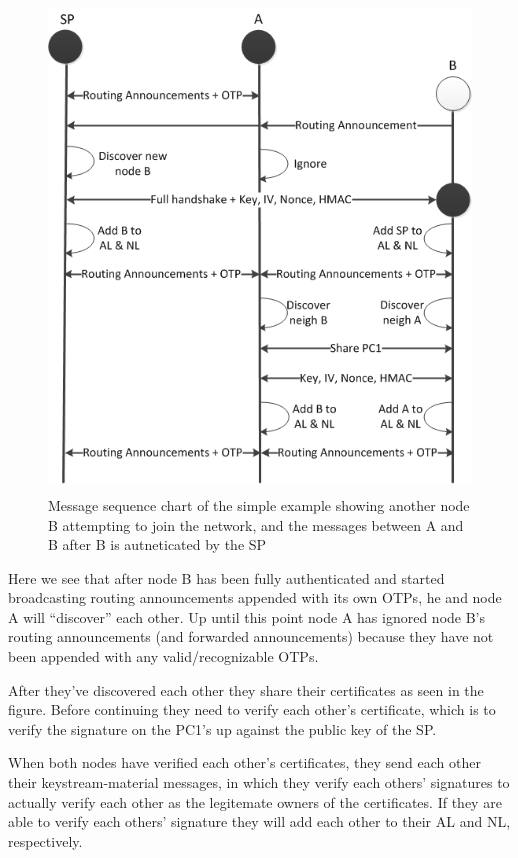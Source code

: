 \begin{figure}[h]
	\centering
  	\includegraphics[height=13cm]{images/simple_example_msc_2.png}
  	\caption{Message sequence chart of the simple example showing another node B
  	  attempting to join the network, and the messages between A and B after B
  	  is autneticated by the SP}
	\label{fig:simple_example_msc_2}
\end{figure}

Here we see that after node B has been fully authenticated and started
broadcasting routing announcements appended with its own \acp{OTP}, he and node
A will ``discover'' each other. Up until this point node A has ignored node B's
routing announcements (and forwarded announcements) because they have not been
appended with any valid/recognizable \acp{OTP}.

After they've discovered each other they share their certificates as seen in the
figure. Before continuing they need to verify each other's certificate, which is
to verify the signature on the \ac{PC1}'s up against the public key of the
\ac{SP}.

When both nodes have verified each other's certificates, they send each other
their keystream-material messages, in which they verify each others' signatures
to actually verify each other as the legitemate owners of the certificates. If
they are able to verify each others' signature they will add each other to their
\ac{AL} and \ac{NL}, respectively.

